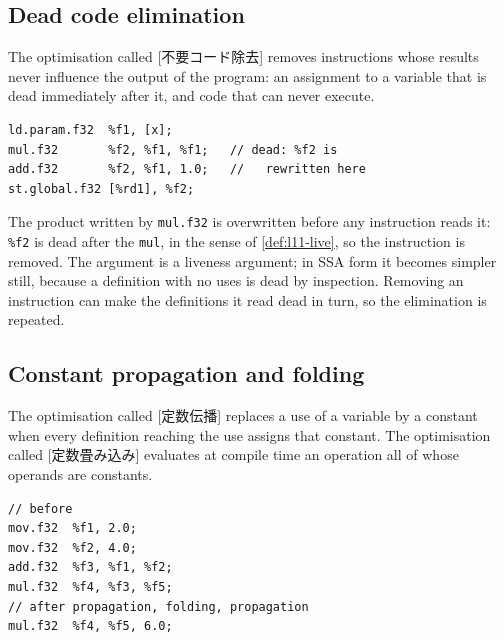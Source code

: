 \documentclass[../main.tex]{subfiles}
\begin{document}
\subsection{Dead code elimination}

\begin{definition}
  \label{def:l11-dce}
  The optimisation called [不要コード除去]
  removes instructions whose
  results never influence the output of the program: an assignment to a
  variable that is dead immediately after it, and code that can never
  execute.
\end{definition}

\begin{lstlisting}[language=PTX, numbers=none]
ld.param.f32  %f1, [x];
mul.f32       %f2, %f1, %f1;   // dead: %f2 is
add.f32       %f2, %f1, 1.0;   //   rewritten here
st.global.f32 [%rd1], %f2;
\end{lstlisting}

The product written by \texttt{mul.f32} is overwritten before any
instruction reads it: \texttt{\%f2} is dead after the \texttt{mul}, in
the sense of \cref{def:l11-live}, so the instruction is removed.  The
argument is a liveness argument; in SSA form it becomes simpler still,
because a definition with no uses is dead by inspection.  Removing an
instruction can make the definitions it read dead in turn, so the
elimination is repeated.

\subsection{Constant propagation and folding}

\begin{definition}
  \label{def:l11-constprop}
  The optimisation called [定数伝播] replaces
  a use of a variable by a constant when every definition reaching the
  use assigns that constant.  The optimisation called
  [定数畳み込み] evaluates at compile time an
  operation all of whose operands are constants.
\end{definition}

\begin{lstlisting}[language=PTX, numbers=none]
// before
mov.f32  %f1, 2.0;
mov.f32  %f2, 4.0;
add.f32  %f3, %f1, %f2;
mul.f32  %f4, %f3, %f5;
// after propagation, folding, propagation
mul.f32  %f4, %f5, 6.0;
\end{lstlisting}
\end{document}
